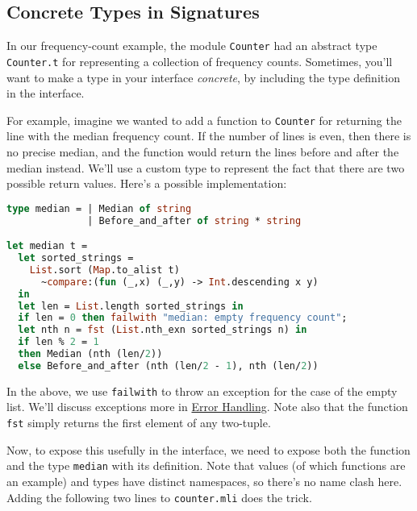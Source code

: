 \hypertarget{concrete-types-in-signatures}{%
\subsection{Concrete Types in
Signatures}\label{concrete-types-in-signatures}}

In our frequency-count example, the module
\passthrough{\lstinline!Counter!} had an abstract type
\passthrough{\lstinline!Counter.t!} for representing a collection of
frequency counts. Sometimes, you'll want to make a type in your
interface \emph{concrete}, by including the type definition in the
interface. 

For example, imagine we wanted to add a function to
\passthrough{\lstinline!Counter!} for returning the line with the median
frequency count. If the number of lines is even, then there is no
precise median, and the function would return the lines before and after
the median instead. We'll use a custom type to represent the fact that
there are two possible return values. Here's a possible implementation:

\begin{lstlisting}[language=Caml]
type median = | Median of string
              | Before_and_after of string * string

let median t =
  let sorted_strings =
    List.sort (Map.to_alist t)
      ~compare:(fun (_,x) (_,y) -> Int.descending x y)
  in
  let len = List.length sorted_strings in
  if len = 0 then failwith "median: empty frequency count";
  let nth n = fst (List.nth_exn sorted_strings n) in
  if len % 2 = 1
  then Median (nth (len/2))
  else Before_and_after (nth (len/2 - 1), nth (len/2))
\end{lstlisting}

In the above, we use \passthrough{\lstinline!failwith!} to throw an
exception for the case of the empty list. We'll discuss exceptions more
in \href{error-handling.html\#error-handling}{Error Handling}. Note also
that the function \passthrough{\lstinline!fst!} simply returns the first
element of any two-tuple.

Now, to expose this usefully in the interface, we need to expose both
the function and the type \passthrough{\lstinline!median!} with its
definition. Note that values (of which functions are an example) and
types have distinct namespaces, so there's no name clash here. Adding
the following two lines to \passthrough{\lstinline!counter.mli!} does
the trick.

